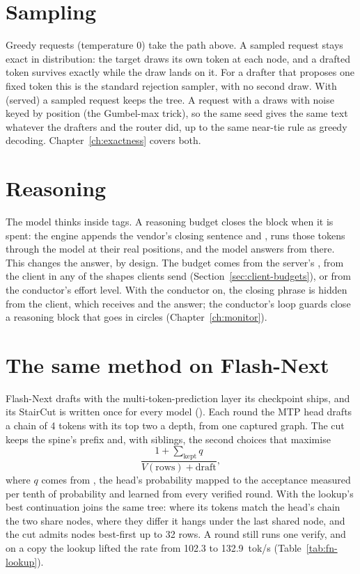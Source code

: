 \section{Sampling}

Greedy requests (temperature 0) take the path above. A sampled request stays exact in distribution: the target draws its own token at each node, and a drafted token survives exactly while the draw lands on it. For a drafter that proposes one fixed token this is the standard rejection sampler, with no second draw. With  (served) a sampled request keeps the tree. A request with a  draws with noise keyed by position (the Gumbel-max trick), so the same seed gives the same text whatever the drafters and the router did, up to the same near-tie rule as greedy decoding. Chapter~\ref{ch:exactness} covers both.

\section{Reasoning}

The model thinks inside  tags. A reasoning budget closes the block when it is spent: the engine appends the vendor's closing sentence and , runs those tokens through the model at their real positions, and the model answers from there. This changes the answer, by design. The budget comes from the server's , from the client in any of the shapes clients send (Section~\ref{sec:client-budgets}), or from the conductor's effort level. With the conductor on, the closing phrase is hidden from the client, which receives  and the answer; the conductor's loop guards close a reasoning block that goes in circles (Chapter~\ref{ch:monitor}).

\section{The same method on Flash-Next}\label{sec:spec-flashnext}

Flash-Next drafts with the multi-token-prediction layer its checkpoint ships, and its StairCut is written once for every model (). Each round the MTP head drafts a chain of 4 tokens with its top two a depth, from one captured graph. The cut keeps the spine's prefix and, with siblings, the second choices that maximise
\[
\frac{1 + \sum_{\text{kept}} q}{V(\text{rows}) + \text{draft}},
\]
where $q$ comes from , the head's probability mapped to the acceptance measured per tenth of probability and learned from every verified round. With  the lookup's best continuation joins the same tree: where its tokens match the head's chain the two share nodes, where they differ it hangs under the last shared node, and the cut admits nodes best-first up to 32 rows. A round still runs one verify, and on a copy the lookup lifted the rate from 102.3 to 132.9~tok/s (Table~\ref{tab:fn-lookup}).

